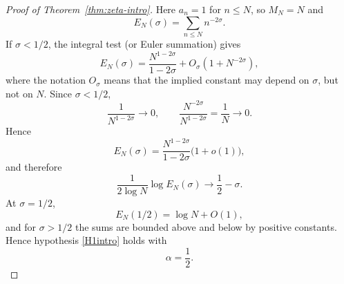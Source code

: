 \documentclass[11pt]{article}
\theoremstyle{definition}
\newcommand{\1}{\mathbf 1}
\begin{document}
\begin{proof}[Proof of Theorem~\ref{thm:zeta-intro}]
Here $a_n=1$ for $n\le N$, so $M_N=N$ and
\begin{equation}\label{eq:zeta-global-energy}
E_N(\sigma)=\sum_{n\le N}n^{-2\sigma}.
\end{equation}
If $\sigma<1/2$, the integral test (or Euler summation) gives
\begin{equation}\label{eq:zeta-energy-left}
E_N(\sigma)
=
\frac{N^{1-2\sigma}}{1-2\sigma}
+O_\sigma(1+N^{-2\sigma}),
\end{equation}
where the notation $O_\sigma$ means that the implied constant may
depend on $\sigma$, but not on $N$.  Since $\sigma<1/2$,
\[
\frac{1}{N^{1-2\sigma}}\longrightarrow0,
\qquad
\frac{N^{-2\sigma}}{N^{1-2\sigma}}
=\frac1N\longrightarrow0.
\]
Hence
\[
E_N(\sigma)
=
\frac{N^{1-2\sigma}}{1-2\sigma}\bigl(1+o(1)\bigr),
\]
and therefore
\[
\frac{1}{2\log N}\log E_N(\sigma)
\longrightarrow
\frac12-\sigma.
\]
At $\sigma=1/2$,
\[
E_N(1/2)=\log N+O(1),
\]
and for $\sigma>1/2$ the sums are bounded above and below by positive constants.  Hence hypothesis \ref{H1intro} holds with
\[
\alpha=\frac12.
\]


\end{proof}
\end{document}

